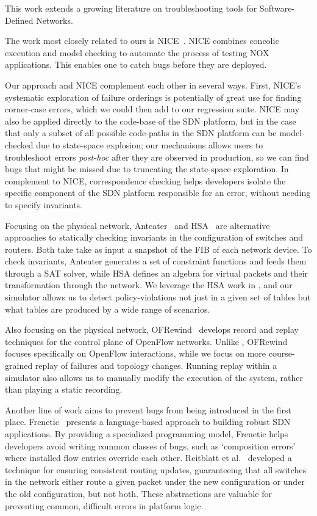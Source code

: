 This work extends a growing literature on troubleshooting tools for
Software-Defined Networks.
    
The work most closely related to ours is NICE~\cite{nice}. NICE combines concolic execution
and model checking to automate the process of testing NOX applications. This enables one to catch bugs before
they are deployed.  

Our approach and NICE complement each other in several ways.  First, NICE's systematic exploration of failure orderings 
is potentially of great use for finding corner-case errors, which we could then add to our regression suite. NICE may also be applied directly to the code-base of the SDN platform, but in the case that only a subset
of all possible code-paths in the SDN platform can be model-checked due to state-space explosion; 
our mechanisms allows users to troubleshoot errors 
{\it post-hoc} after they are observed in production, so we can find bugs that might be missed due to truncating the state-space exploration.
In complement to NICE, correspondence checking helps developers isolate the
specific component of the SDN platform responsible for an error, without needing to specify invariants.

Focusing on the physical network, Anteater~\cite{anteater} and HSA~\cite{hsa}
are alternative approaches to statically checking invariants in the
configuration of switches and routers. Both take take as input a snapshot of
the FIB of each network device. To check invariants, Anteater generates a set of constraint functions and feeds them through a SAT
solver, while HSA defines an algebra for virtual packets and
their transformation through the network. We leverage the HSA work in \projectname{}, and our simulator allows us to detect policy-violations not just in a given set of tables but what tables are produced by a wide range of scenarios. \

Also focusing on the physical network, OFRewind~\cite{ofrewind} develops
record and replay techniques for the control plane of OpenFlow networks.
Unlike \simulator, OFRewind focuses specifically on OpenFlow
interactions, while we focus on more course-grained replay of
failures and topology changes. Running replay within a simulator also allows
us to manually modify the execution of the system, rather than playing a
static recording. 

Another line of work aims to prevent bugs from being introduced in the first
place. Frenetic~\cite{frenetic} presents a language-based approach to building
robust SDN applications. By providing a specialized programming model,
 Frenetic helps developers avoid writing common classes of
bugs, such as `composition errors' where installed flow entries override each other.
Reitblatt et al.~\cite{consistentupdates} developed a technique for ensuring
consistent routing updates, guaranteeing that all switches in the network either route
a given packet under the new configuration or under the old configuration,
but not both. These abstractions are valuable for preventing common, difficult errors
in platform logic.

